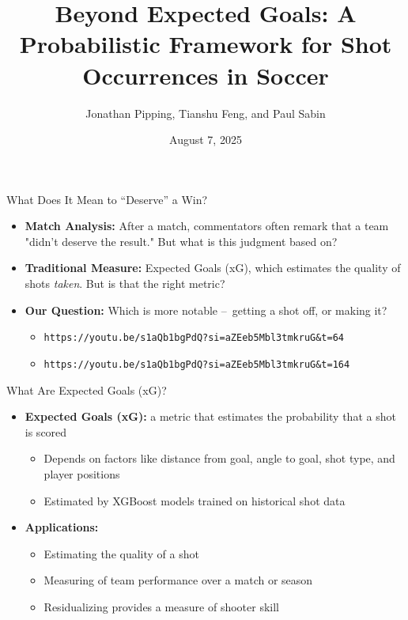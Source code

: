 \documentclass{beamer}
\title[Beyond Expected Goals]{Beyond Expected Goals: A Probabilistic Framework for Shot Occurrences in Soccer}
\author[Pipping, Feng, and Sabin]{Jonathan Pipping, Tianshu Feng, and Paul Sabin}
\date{August 7, 2025}
\institute[UPenn]{University of Pennsylvania}
\begin{document}
\frame{\titlepage}

\begin{frame}[fragile]{What Does It Mean to ``Deserve'' a Win?}
\begin{itemize}
\item \textbf{Match Analysis:} After a match, commentators often remark that a team "didn't deserve the result." But what is this judgment based on?
\item \textbf{Traditional Measure:} Expected Goals (xG), which estimates the quality of shots \emph{taken}. But is that the right metric?
\item \textbf{Our Question:} Which is more notable – getting a shot off, or making it?
  \begin{itemize}
  \item \verb|https://youtu.be/s1aQb1bgPdQ?si=aZEeb5Mbl3tmkruG&t=64|
  \item \verb|https://youtu.be/s1aQb1bgPdQ?si=aZEeb5Mbl3tmkruG&t=164|
  \end{itemize}
\end{itemize}
\end{frame}

\begin{frame}{What Are Expected Goals (xG)?}
\begin{itemize}
\item \textbf{Expected Goals (xG):} a metric that estimates the probability that a shot is scored
\begin{itemize}
  \item Depends on factors like distance from goal, angle to goal, shot type, and player positions
  \item Estimated by XGBoost models trained on historical shot data
\end{itemize}
\item  \textbf{Applications:}
  \begin{itemize}
  \item Estimating the quality of a shot
  \item Measuring of team performance over a match or season
  \item Residualizing provides a measure of shooter skill
  \end{itemize}
\end{itemize}
\end{frame}
\end{document}
